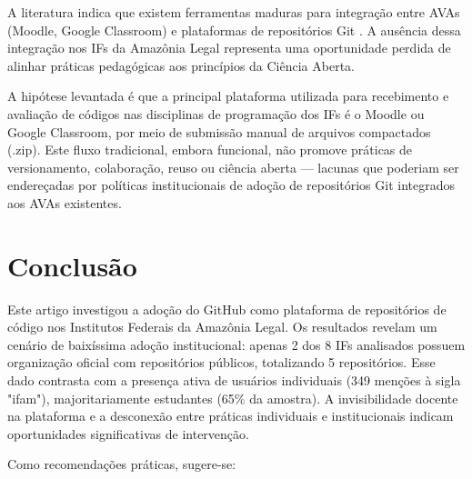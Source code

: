 \documentclass[english, spanish, brazilian]{RBIEarticle}
\begin{document}
A literatura indica que existem ferramentas maduras para integração entre AVAs (Moodle, Google Classroom) e plataformas de repositórios Git \cite{moodle2024, google2024}. A ausência dessa integração nos IFs da Amazônia Legal representa uma oportunidade perdida de alinhar práticas pedagógicas aos princípios da Ciência Aberta.

A hipótese levantada é que a principal plataforma utilizada para recebimento e avaliação de códigos nas disciplinas de programação dos IFs é o Moodle ou Google Classroom, por meio de submissão manual de arquivos compactados (.zip). Este fluxo tradicional, embora funcional, não promove práticas de versionamento, colaboração, reuso ou ciência aberta — lacunas que poderiam ser endereçadas por políticas institucionais de adoção de repositórios Git integrados aos AVAs existentes.

\section{Conclusão}

Este artigo investigou a adoção do GitHub como plataforma de repositórios de código nos Institutos Federais da Amazônia Legal. Os resultados revelam um cenário de baixíssima adoção institucional: apenas 2 dos 8 IFs analisados possuem organização oficial com repositórios públicos, totalizando 5 repositórios. Esse dado contrasta com a presença ativa de usuários individuais (349 menções à sigla "ifam"), majoritariamente estudantes (65\% da amostra). A invisibilidade docente na plataforma e a desconexão entre práticas individuais e institucionais indicam oportunidades significativas de intervenção.

Como recomendações práticas, sugere-se:
\end{document}
